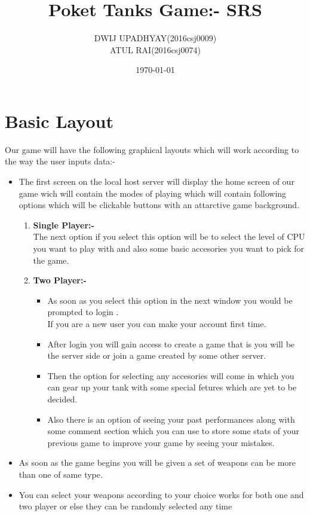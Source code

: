 \documentclass[12pt]{article}
\author{DWIJ UPADHYAY(2016csj0009)\\ATUL RAI(2016csj0074)}
\date{\today}
\title{\textbf{Poket Tanks Game:- SRS}}
\begin{document}
 
\maketitle
\tableofcontents
\newpage
\section{Basic Layout}
Our game will have the following graphical layouts which will work according to the way the user inputs data:-
\begin{itemize}
\item The first screen on the local host server will display the home screen of our game wich will contain the modes of playing which will contain following options which will be clickable buttons with an attarctive game background.
\begin{enumerate}
\item \textbf{Single Player:-}\\
The next option if you select this option will be to select the level of CPU you want to play with and also some basic accesories you want to pick for the game.
\item \textbf{Two Player:-}
\begin{itemize}
\item As soon as you select this option in the next window you would be prompted to login .\\If you are a new user you can make your account first time.
\item After login you will gain access to create a game that is you will be the server side or join a game created by some other server.\\
\item Then the option for selecting any accesories will come in which you can gear up your tank with some special fetures which are yet to be decided.
\item Also there is an option of seeing your past performances along with some comment section which you can use to store some stats of your previous game to improve your game by seeing your mistakes.
\end{itemize}
\end{enumerate}
\item As soon as the game begins you will be given a set of weapons can be more than one of same type.
\item You can select your weapons according to your choice works for both one and two player or else they can be randomly selected any time

\end{itemize}
\end{document}
